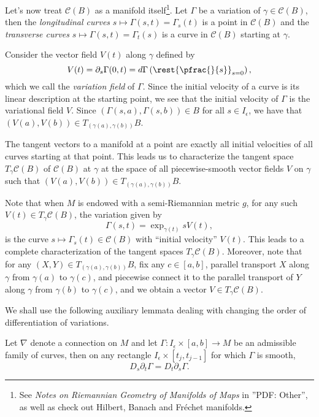 Let's now treat $\mathcal{C}(B)$ as a manifold itself\footnote{See \textit{Notes on Riemannian Geometry of Manifolds of Maps} in ''PDF: Other'', as well as check out Hilbert, Banach and Fr\'echet manifolds.}.  Let $\Gamma$ be a variation of $\gamma\in\mathcal{C}(B)$, then the \textit{longitudinal curves} $s\mapsto\Gamma(s,t)=\Gamma_s(t)$ is a point in $\mathcal{C}(B)$ and the \textit{transverse curves} $s\mapsto\Gamma(s,t)=\Gamma_t(s)$ is a curve in $\mathcal{C}(B)$ starting at $\gamma$.  

Consider the vector field $V(t)$ along $\gamma$ defined by
$$V(t)=\partial_s\Gamma(0,t)=d\Gamma\left(\rest{\pfrac{}{s}}_{s=0}\right),$$
which we call the \textit{variation field} of $\Gamma$.  Since the initial velocity of a curve is its linear description at the starting point, we see that the initial velocity of $\Gamma$ is the variational field $V$.  Since $(\Gamma(s,a),\Gamma(s,b))\in B$ for all $s\in I_\epsilon$, we have that $(V(a),V(b))\in T_{(\gamma(a),\gamma(b))}B$.  

The tangent vectors to a manifold at a point are exactly all initial velocities of all curves starting at that point.  This leads us to characterize the tangent space $T_\gamma\mathcal{C}(B)$ of $\mathcal{C}(B)$ at $\gamma$ at the space of all piecewise-smooth vector fields $V$ on $\gamma$ such that $(V(a),V(b))\in T_{(\gamma(a),\gamma(b))}B$.  

Note that when $M$ is endowed with a semi-Riemannian metric $g$, for any such $V(t)\in T_\gamma\mathcal{C}(B)$, the variation given by
\begin{equation}\label{eq:genVariation}
\Gamma(s,t)=\exp_{\gamma(t)}{sV(t)},
\end{equation}
is the curve $s\mapsto\Gamma_s(t)\in\mathcal{C}(B)$ with ``initial velocity'' $V(t)$.  This leads to a complete characterization of the tangent spaces $T_\gamma\mathcal{C}(B)$.  Moreover, note that for any $(X,Y)\in T_{(\gamma(a),\gamma(b))}B$, fix any $c\in[a,b]$, parallel transport $X$ along $\gamma$ from $\gamma(a)$ to $\gamma(c)$, and piecewise connect it to the parallel transport of $Y$ along $\gamma$ from $\gamma(b)$ to $\gamma(c)$, and we obtain a vector $V\in T_\gamma\mathcal{C}(B)$.

We shall use the following auxiliary lemmata dealing with changing the order of differentiation of variations.

\begin{lem}\label{thm:symmetryLemma}
    Let $\nabla$ denote a connection on $M$ and let $\Gamma:I_\epsilon\times[a,b]\to M$ be an admissible family of curves, then on any rectangle $I_\epsilon\times[t_j,t_{j-1}]$ for which $\Gamma$ is smooth,
    $$D_s\partial_t\Gamma=D_t\partial_s\Gamma.$$
\end{lem}

